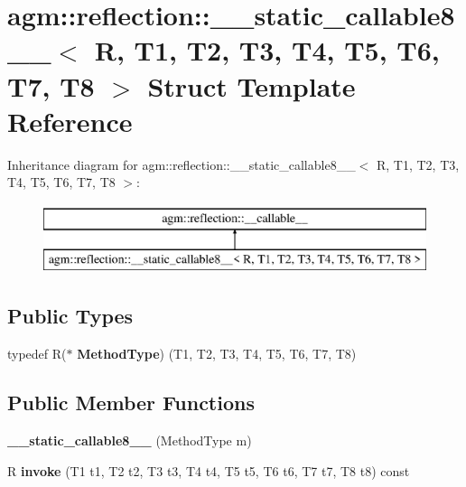 \hypertarget{structagm_1_1reflection_1_1____static__callable8____}{}\section{agm\+:\+:reflection\+:\+:\+\_\+\+\_\+static\+\_\+callable8\+\_\+\+\_\+$<$ R, T1, T2, T3, T4, T5, T6, T7, T8 $>$ Struct Template Reference}
\label{structagm_1_1reflection_1_1____static__callable8____}
Inheritance diagram for agm\+:\+:reflection\+:\+:\+\_\+\+\_\+static\+\_\+callable8\+\_\+\+\_\+$<$ R, T1, T2, T3, T4, T5, T6, T7, T8 $>$\+:\begin{figure}[H]
\begin{center}
\leavevmode
\includegraphics[height=2.000000cm]{structagm_1_1reflection_1_1____static__callable8____}
\end{center}
\end{figure}
\subsection*{Public Types}
\begin{DoxyCompactItemize}
\item 
typedef R($\ast$ {\bfseries Method\+Type}) (T1, T2, T3, T4, T5, T6, T7, T8)\hypertarget{structagm_1_1reflection_1_1____static__callable8_____a1aab73a74c488f463540ca7e5e6861f4}{}\label{structagm_1_1reflection_1_1____static__callable8_____a1aab73a74c488f463540ca7e5e6861f4}

\end{DoxyCompactItemize}
\subsection*{Public Member Functions}
\begin{DoxyCompactItemize}
\item 
{\bfseries \+\_\+\+\_\+static\+\_\+callable8\+\_\+\+\_\+} (Method\+Type m)\hypertarget{structagm_1_1reflection_1_1____static__callable8_____a9897601c1ee87a4666bdaf6c642905f6}{}\label{structagm_1_1reflection_1_1____static__callable8_____a9897601c1ee87a4666bdaf6c642905f6}

\item 
R {\bfseries invoke} (T1 t1, T2 t2, T3 t3, T4 t4, T5 t5, T6 t6, T7 t7, T8 t8) const \hypertarget{structagm_1_1reflection_1_1____static__callable8_____a6642b26aafce9346bd910c2b71061ded}{}\label{structagm_1_1reflection_1_1____static__callable8_____a6642b26aafce9346bd910c2b71061ded}

\end{DoxyCompactItemize}
